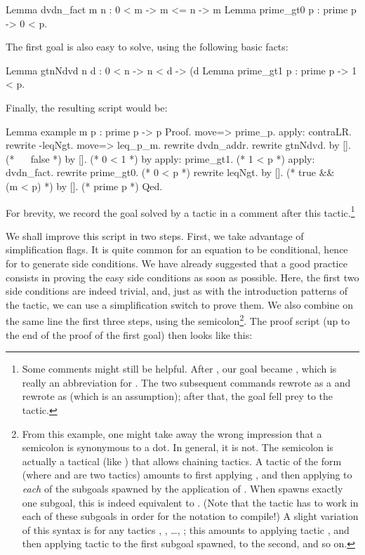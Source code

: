 \begin{coq}{}{}
Lemma dvdn_fact m n : 0 < m -> m <= n -> m %
Lemma prime_gt0 p : prime p -> 0 < p.
\end{coq}

The first goal is also easy to solve, using the following basic facts:

\begin{coq}{}{}
Lemma gtnNdvd n d : 0 < n -> n < d -> (d %
Lemma prime_gt1 p : prime p -> 1 < p.
\end{coq}
Finally, the resulting script would be:

\begin{coq}{}{}
Lemma example m p : prime p -> p %
Proof.
move=> prime_p.
apply: contraLR.
rewrite -leqNgt.
move=> leq_p_m.
rewrite dvdn_addr.
  rewrite gtnNdvd.
    by [].  (* ~~ false *)
    by [].  (* 0 < 1 *)
  by apply: prime_gt1.  (* 1 < p *)
apply: dvdn_fact.
  rewrite prime_gt0.  (* 0 < p *)
  rewrite leqNgt.
  by [].  (* true && ~~ (m < p) *)
by [].   (* prime p *)
Qed.
\end{coq}
For brevity, we record the goal solved by a tactic in a comment after
this tactic.\footnote{Some comments might still be helpful.
After , our goal became
, which is really an abbreviation for
. The two subsequent  commands
rewrote  as a  and rewrote  as
 (which is an assumption); after that, the goal fell
prey to the  tactic.}

We shall improve this script in two steps.  First, we take advantage of
 simplification flags.  It is quite common
for an equation to be conditional, hence for  to generate side
conditions.  We have already suggested that a good practice consists
in proving the easy side conditions
as soon as possible.  Here, the first two side conditions are indeed
trivial, and, just as with the introduction patterns of the  tactic,
we can use a simplification switch \C{//} to prove them.
We also combine on the same line the first three steps, using
the semicolon\footnote{From this example, one might take away the
wrong impression that a semicolon is synonymous to a dot. In general,
it is not. The semicolon is actually a tactical (like ) that
allows chaining tactics. A tactic of the form  (where
 and  are two tactics) amounts to first applying
, and then applying  to \emph{each} of the subgoals
spawned by the application of . When  spawns exactly
one subgoal, this is indeed equivalent to . (Note that the
tactic  has to work in each of these subgoals in order for
the notation to compile!)
A slight
variation of this syntax is  for any
tactics , , \ldots, ; this amounts to applying
tactic , and then applying tactic  to the first subgoal
spawned,  to the second, and so on.}.
The proof script (up to the end of the proof of the first
goal) then looks like this:

